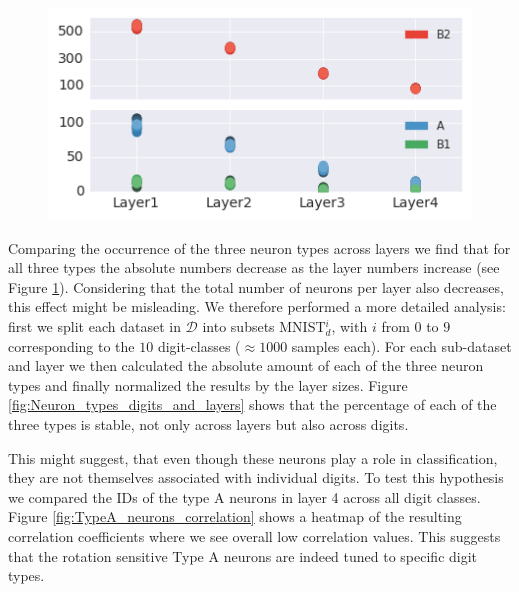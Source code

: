 \documentclass[10pt,a4paper]{article}
\begin{document}

\begin{figure}
\centering
  	\includegraphics[width=\linewidth]{absolute_numbers.png}
    \label{fig:abs_numbers}
\end{figure}


\noindent Comparing the occurrence of the three neuron types across layers we find that for all three types the absolute numbers decrease as the layer numbers increase (see Figure \ref{fig:abs_numbers}). Considering that the total number of neurons per layer also decreases, this effect might be misleading. We therefore performed a more detailed analysis: first we split each dataset in $\mathcal{D}$ into subsets MNIST$_d^i$, with $i$ from $0$ to $9$ corresponding to the $10$ digit-classes ($\approx 1000$ samples each). For each sub-dataset and layer we then calculated the absolute amount of each of the three neuron types and finally normalized the results by the layer sizes. Figure \ref{fig:Neuron_types_digits_and_layers} shows that the percentage of each of the three types is stable, not only across layers but also across digits.\newline  

\noindent This might suggest, that even though these neurons play a role in classification, they are not themselves associated with individual digits. To test this hypothesis we compared the IDs of the type A neurons in layer 4 across all digit classes. Figure \ref{fig:TypeA_neurons_correlation} shows a heatmap of the resulting correlation coefficients where we see overall low correlation values. This suggests that the rotation sensitive Type A neurons are indeed tuned to specific digit types. \newline
\end{document}
